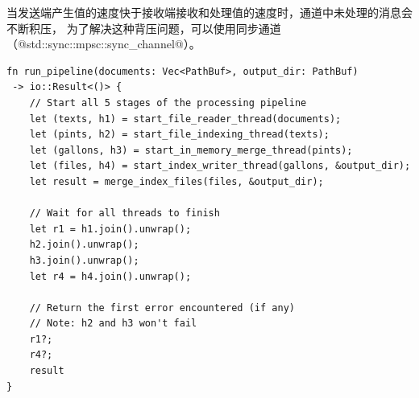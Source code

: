 当发送端产生值的速度快于接收端接收和处理值的速度时，通道中未处理的消息会不断积压，
为了解决这种背压问题，可以使用同步通道（@std::sync::mpsc::sync_channel@）。

\begin{code}[title=pipeline]
    \begin{verbatim}
fn run_pipeline(documents: Vec<PathBuf>, output_dir: PathBuf)
 -> io::Result<()> {
    // Start all 5 stages of the processing pipeline
    let (texts, h1) = start_file_reader_thread(documents);
    let (pints, h2) = start_file_indexing_thread(texts);
    let (gallons, h3) = start_in_memory_merge_thread(pints);
    let (files, h4) = start_index_writer_thread(gallons, &output_dir);
    let result = merge_index_files(files, &output_dir);

    // Wait for all threads to finish
    let r1 = h1.join().unwrap();
    h2.join().unwrap();
    h3.join().unwrap();
    let r4 = h4.join().unwrap();

    // Return the first error encountered (if any)
    // Note: h2 and h3 won't fail
    r1?;
    r4?;
    result
}
\end{verbatim}
\end{code}

